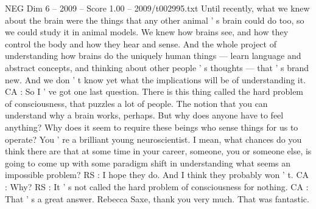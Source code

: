 \begin{textsample}{NEG Dim 6 – 2009 – Score 1.00 – 2009/t002995.txt}
Until recently, what we knew about the brain were the things that any other animal ' s brain could do too, so we could study it in animal models.
We knew how brains see, and how they control the body and how they hear and sense.
And the whole project of understanding how brains do the uniquely human things — learn language and abstract concepts, and thinking about other people ' s thoughts — that ' s brand new.
And we don ' t know yet what the implications will be of understanding it.
CA : So I ' ve got one last question.
There is this thing called the hard problem of consciousness, that puzzles a lot of people.
The notion that you can understand why a brain works, perhaps.
But why does anyone have to feel anything?
Why does it seem to require these beings who sense things for us to operate?
You ' re a brilliant young neuroscientist.
I mean, what chances do you think there are that at some time in your career, someone, you or someone else, is going to come up with some paradigm shift in understanding what seems an impossible problem?
RS : I hope they do.
And I think they probably won ' t.
CA : Why?
RS : It ' s not called the hard problem of consciousness for nothing.
CA : That ' s a great answer.
Rebecca Saxe, thank you very much.
That was fantastic.

\end{textsample}
